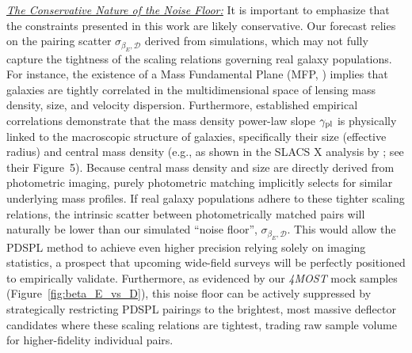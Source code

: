 \documentclass[a4paper,11pt]{article}
\begin{document}
\noindent \underline{\textit{The Conservative Nature of the Noise Floor:}}
It is important to emphasize that the constraints presented in this work are likely conservative. Our forecast relies on the pairing scatter $\sigma_{\beta_E, \mathcal{D}}$ derived from simulations, which may not fully capture the tightness of the scaling relations governing real galaxy populations. 
For instance, the existence of a Mass Fundamental Plane (MFP, \cite{Mozumdar:2025}) implies that galaxies are tightly correlated in the multidimensional space of lensing mass density, size, and velocity dispersion. 
Furthermore, established empirical correlations demonstrate that the mass density power-law slope $\gamma_{\rm pl}$ is physically linked to the macroscopic structure of galaxies, specifically their size (effective radius) and central mass density (e.g., as shown in the SLACS X analysis by \cite{Auger:2010}; see their Figure~5). Because central mass density and size are directly derived from photometric imaging, purely photometric matching implicitly selects for similar underlying mass profiles. If real galaxy populations adhere to these tighter scaling relations, the intrinsic scatter between photometrically matched pairs will naturally be lower than our simulated ``noise floor'', $\sigma_{\beta_E, \mathcal{D}}$. This would allow the PDSPL method to achieve even higher precision relying solely on imaging statistics, a prospect that upcoming wide-field surveys will be perfectly positioned to empirically validate. Furthermore, as evidenced by our \textit{4MOST} mock samples (Figure~\ref{fig:beta_E_vs_D}), this noise floor can be actively suppressed by strategically restricting PDSPL pairings to the brightest, most massive deflector candidates where these scaling relations are tightest, trading raw sample volume for higher-fidelity individual pairs.
\end{document}
